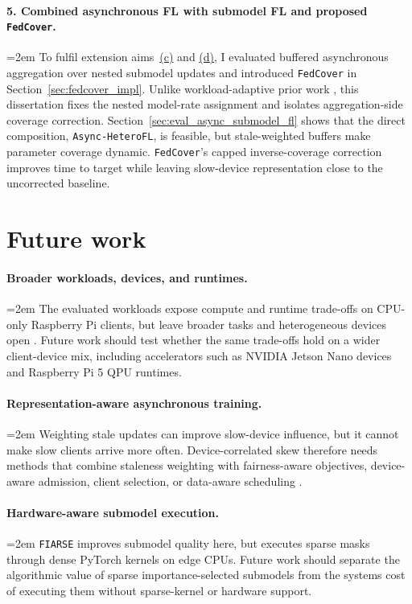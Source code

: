 \paragraph{5. Combined asynchronous FL with submodel FL and proposed \texttt{FedCover}.} \hangindent=2em
To fulfil extension aims~\hyperref[eaim:c]{(c)} and \hyperref[eaim:d]{(d)}, I evaluated buffered asynchronous aggregation over nested submodel updates and introduced \texttt{FedCover} in Section~\ref{sec:fedcover_impl}. Unlike workload-adaptive prior work \parencite{zhang2023timelyfl}, this dissertation fixes the nested model-rate assignment and isolates aggregation-side coverage correction. Section~\ref{sec:eval_async_submodel_fl} shows that the direct composition, \texttt{Async-HeteroFL}, is feasible, but stale-weighted buffers make parameter coverage dynamic. \texttt{FedCover}'s capped inverse-coverage correction improves time to target while leaving slow-device representation close to the uncorrected baseline.

\section{Future work}
\label{sec:future_work}

\paragraph{Broader workloads, devices, and runtimes.} \hangindent=2em
The evaluated workloads expose compute and runtime trade-offs on CPU-only Raspberry Pi clients, but leave broader tasks and heterogeneous devices open \parencite{caldas2018leaf,lai2022fedscale,li2021ditto}. Future work should test whether the same trade-offs hold on a wider client-device mix, including accelerators such as NVIDIA Jetson Nano devices and Raspberry Pi 5 QPU runtimes.

\paragraph{Representation-aware asynchronous training.} \hangindent=2em
Weighting stale updates can improve slow-device influence, but it cannot make slow clients arrive more often. Device-correlated skew therefore needs methods that combine staleness weighting with fairness-aware objectives, device-aware admission, client selection, or data-aware scheduling \parencite{li2019qffl,nishio2018fedcs,lai2021oort,chai2020tifl}.

\paragraph{Hardware-aware submodel execution.} \hangindent=2em
\texttt{FIARSE} improves submodel quality here, but executes sparse masks through dense PyTorch kernels on edge CPUs. Future work should separate the algorithmic value of sparse importance-selected submodels from the systems cost of executing them without sparse-kernel or hardware support.

